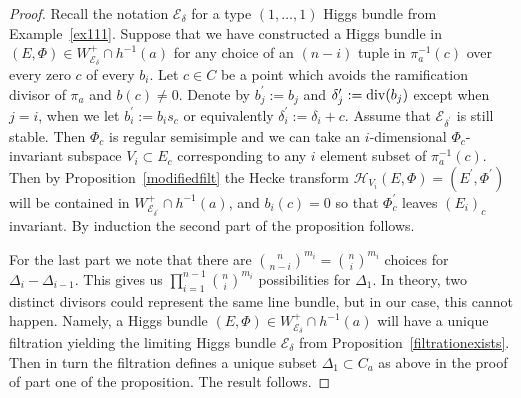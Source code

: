 \documentclass[12pt]{article}
\numberwithin{equation}{section}
\renewcommand{\div}{{\rm div}}
\theoremstyle{remark}
\theoremstyle{definition}
\numberwithin{theorem}{section}
\def\calE{{\mathcal E}}
\def\calH{\mathcal{H}}
\def\d{{{\delta}}}
\renewcommand{\1}{\mathbbm{1}}
\begin{document}
\begin{proof}
	Recall the notation $\calE_{\delta}$ for a type $(1,\dots,1)$ Higgs bundle from Example~\ref{ex111}. Suppose  that we have constructed a Higgs bundle in $(E,\Phi)\in W^+_{\calE_{\d}}\cap h^{-1}(a)$ for any choice of an $(n-i)$ tuple in $\pi_a^{-1}(c)$ over every zero $c$ of every $b_i$. Let $c\in C$ be a point which avoids the ramification divisor of $\pi_a$ and $b(c)\neq 0$. Denote by $b^\prime_j:=b_j$ and $\delta_j^\prime:=\div(b_j)$ except when $j=i$,  when we let $b^\prime_i:=b_i s_c$ or equivalently $\d^\prime_i:=\d_i+c$. Assume that $\calE_{\d^\prime}$ is still stable.  Then $\Phi_c$ is regular semisimple and we can take an $i$-dimensional $\Phi_c$-invariant subspace $V_i\subset E_c$ corresponding to any $i$ element subset of $\pi_a^{-1}(c)$. Then by Proposition~\ref{modifiedfilt} the Hecke transform  $\calH_{V_i}(E,\Phi)=(E^\prime,\Phi^\prime)$ will be contained in $W^+_{\calE_{\d^\prime}}\cap h^{-1}(a)$, and $b_i(c)=0$ so that $\Phi^\prime_c$ leaves $(E_i)_c$ invariant. By induction the second part of the proposition follows.   
	
	For the last part we note that there are ${n\choose n-i}^{m_i}={n\choose i}^{m_i}$ choices for $\Delta_i-\Delta_{i-1}$. 	This gives us $\prod_{i=1}^{n-1}{n \choose i}^{m_i}$ possibilities for $\Delta_1$.  In theory, two distinct divisors could represent the same line bundle, but in our case, this cannot happen. Namely, a Higgs bundle $(E,\Phi) \in W^+_{\calE_{\d}}\cap h^{-1}(a)$ will have a unique filtration yielding the limiting Higgs bundle $\calE_{\d}$ from Proposition~\ref{filtrationexists}. Then in turn the  filtration  defines a unique subset $\Delta_1\subset C_a$ as above in the proof of part one of the proposition. The result follows.
	
	
	
	
\end{proof}
\end{document}
